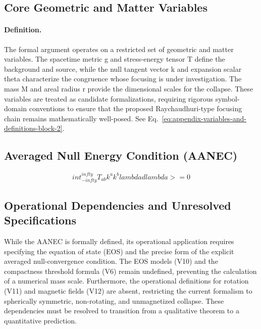 \documentclass[conference]{IEEEtran}
\begin{document}
\subsection{Core Geometric and Matter Variables}
\paragraph{Definition.} The formal argument operates on a restricted set of geometric and matter variables. The spacetime metric g and stress-energy tensor T define the background and source, while the null tangent vector k and expansion scalar theta characterize the congruence whose focusing is under investigation. The mass M and areal radius r provide the dimensional scales for the collapse. These variables are treated as candidate formalizations, requiring rigorous symbol-domain conventions to ensure that the proposed Raychaudhuri-type focusing chain remains mathematically well-posed. See Eq.~\eqref{eq:appendix-variables-and-definitions-block-2}.

\subsection{Averaged Null Energy Condition (AANEC)}
\begin{equation}
int_{-infty}^{infty} T_{ab} k^a k^b lambda d lambda >= 0
\label{eq:appendix-variables-and-definitions-block-2}
\end{equation}

\subsection{Operational Dependencies and Unresolved Specifications}
While the AANEC is formally defined, its operational application requires specifying the equation of state (EOS) and the precise form of the explicit averaged null-convergence condition. The EOS models (V10) and the compactness threshold formula (V6) remain undefined, preventing the calculation of a numerical mass scale. Furthermore, the operational definitions for rotation (V11) and magnetic fields (V12) are absent, restricting the current formalism to spherically symmetric, non-rotating, and unmagnetized collapse. These dependencies must be resolved to transition from a qualitative theorem to a quantitative prediction.
\end{document}
